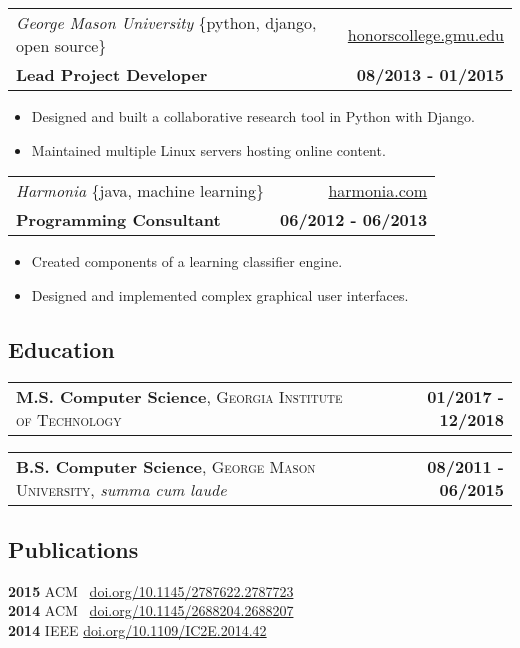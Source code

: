 \documentclass[10pt,letterpaper]{article}
\begin{document}
\vspace{0.25cm}

\noindent\begin{tabularx}{\textwidth}{@{} Xr @{}}
  \textit{George Mason University} \{python, django, open source\} & \href{https://honorscollege.gmu.edu}{honorscollege.gmu.edu} \\
  \textbf{Lead Project Developer} & \textbf{08/2013 - 01/2015}
\end{tabularx}

\begin{itemize}
\item Designed and built a collaborative research tool in Python with Django.
\item Maintained multiple Linux servers hosting online content.
\end{itemize}

\vspace{0.25cm}

\noindent\begin{tabularx}{\textwidth}{@{} Xr @{}}
  \textit{Harmonia} \{java, machine learning\} & \href{https://harmonia.com}{harmonia.com} \\
  \textbf{Programming Consultant} & \textbf{06/2012 - 06/2013}
\end{tabularx}

\begin{itemize}
\item Created components of a learning classifier engine.
\item Designed and implemented complex graphical user interfaces.
\end{itemize}

\subsection{Education}

\noindent
\begin{tabularx}{\textwidth}{@{} Xr @{}}
  \textbf{M.S. Computer Science}, \textsc{Georgia Institute of Technology} & \textbf{01/2017 - 12/2018}
\end{tabularx}

\noindent
\begin{tabularx}{\textwidth}{@{} Xr @{}}
  \textbf{B.S. Computer Science}, \textsc{George Mason University}, \emph{summa cum laude} & \textbf{08/2011 - 06/2015}
\end{tabularx}

\subsection{Publications}

\noindent
\textbf{2015} ACM \ \href{https://doi.org/10.1145/2787622.2787723}{doi.org/10.1145/2787622.2787723} \\
\textbf{2014} ACM \ \href{https://doi.org/10.1145/2688204.2688207}{doi.org/10.1145/2688204.2688207} \\
\textbf{2014} IEEE  \href{https://doi.org/10.1109/IC2E.2014.42}{doi.org/10.1109/IC2E.2014.42}
\end{document}
